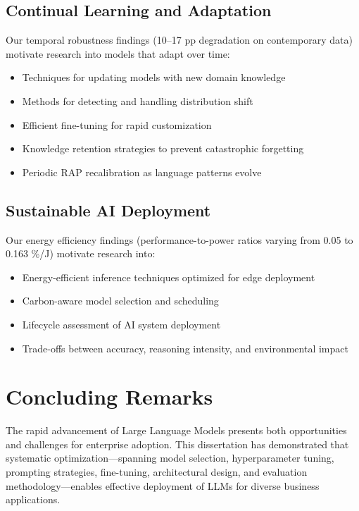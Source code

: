 \subsection{Continual Learning and Adaptation}

Our temporal robustness findings (10--17 pp degradation on contemporary data) motivate research into models that adapt over time:
\begin{itemize}[leftmargin=*]
    \item Techniques for updating models with new domain knowledge
    \item Methods for detecting and handling distribution shift
    \item Efficient fine-tuning for rapid customization
    \item Knowledge retention strategies to prevent catastrophic forgetting
    \item Periodic RAP recalibration as language patterns evolve
\end{itemize}

\subsection{Sustainable AI Deployment}

Our energy efficiency findings (performance-to-power ratios varying from 0.05 to 0.163 \%/J) motivate research into:
\begin{itemize}[leftmargin=*]
    \item Energy-efficient inference techniques optimized for edge deployment
    \item Carbon-aware model selection and scheduling
    \item Lifecycle assessment of AI system deployment
    \item Trade-offs between accuracy, reasoning intensity, and environmental impact
\end{itemize}

\section{Concluding Remarks}
\label{sec:concluding_remarks}

The rapid advancement of Large Language Models presents both opportunities and challenges for enterprise adoption. This dissertation has demonstrated that systematic optimization---spanning model selection, hyperparameter tuning, prompting strategies, fine-tuning, architectural design, and evaluation methodology---enables effective deployment of LLMs for diverse business applications.

